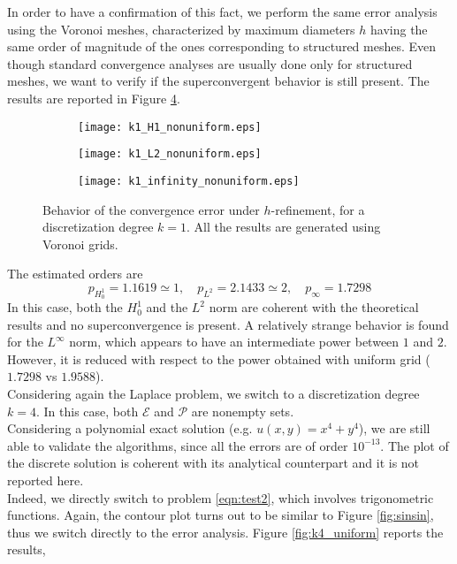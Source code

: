 \documentclass[10pt]{article}
\begin{document}
In order to have a confirmation of this fact, we perform the same error analysis using the Voronoi meshes, characterized by maximum diameters $h$ having the same order of magnitude of the ones corresponding to structured meshes. Even though standard convergence analyses are usually done only for structured meshes, we want to verify if the superconvergent behavior is still present. The results are reported in Figure \ref{fig:k1_nonuniform}. 
\begin{figure}[H]
	\centering
	\begin{subfigure}{0.32\textwidth}
		\centering
		\texttt{[image: k1\_H1\_nonuniform.eps]}
		\label{fig:k1_H1_nonuniform}
	\end{subfigure}
	\begin{subfigure}{0.32\textwidth}
		\centering
		\texttt{[image: k1\_L2\_nonuniform.eps]}
		\label{fig:k1_L2_nonuniform}
	\end{subfigure}
	\begin{subfigure}{0.32\textwidth}
		\centering
		\texttt{[image: k1\_infinity\_nonuniform.eps]}
		\label{fig:k1_infinity_nonuniform}
	\end{subfigure}
	\caption{Behavior of the convergence error under $h$-refinement, for a discretization degree $k=1$. All the results are generated using Voronoi grids.}
	\label{fig:k1_nonuniform}
\end{figure}
The estimated orders are
$$p_{H^1_0}=1.1619\simeq1, \quad p_{L^2}=2.1433\simeq2, \quad p_\infty=1.7298$$
In this case, both the $H^1_0$ and the $L^2$ norm are coherent with the theoretical results and no superconvergence is present. A relatively strange behavior is found for the $L^\infty$ norm, which appears to have an intermediate power between $1$ and $2$. However, it is reduced with respect to the power obtained with uniform grid ($1.7298$ vs $1.9588$). \\
Considering again the Laplace problem, we switch to a discretization degree $k=4$. In this case, both $\mathcal{E}$ and $\mathcal{P}$ are nonempty sets.
\\
Considering a polynomial exact solution (e.g. $u(x,y)=x^4+y^4$), we are still able to validate the algorithms, since all the errors are of order $10^{-13}$. The plot of the discrete solution is coherent with its analytical counterpart and it is not reported here. \\
Indeed, we directly switch to problem \eqref{eqn:test2}, which involves trigonometric functions. Again, the contour plot turns out to be similar to Figure \ref{fig:sinsin}, thus we switch directly to the error analysis. Figure \ref{fig:k4_uniform} reports the results, 
\end{document}
